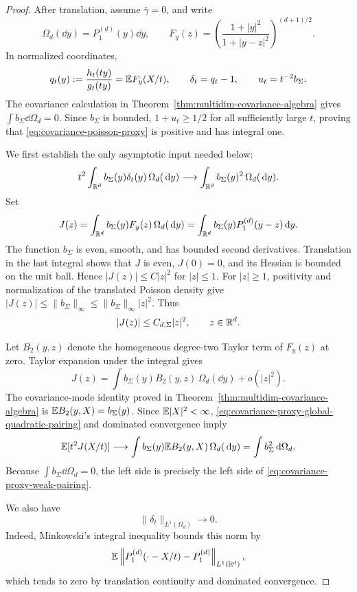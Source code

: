 \begin{proof}
After translation, assume \(\bar\gamma=0\), and write
\[
 \Omega_d(\dd y)=P_1^{(d)}(y)\dd y,
 \qquad
 F_y(z)=\left(\frac{1+|y|^2}{1+|y-z|^2}\right)^{(d+1)/2}.
\]
In normalized coordinates,
\[
 q_t(y):=\frac{h_t(ty)}{g_t(ty)}
 =\mathbb{E} F_y(X/t),
 \qquad \delta_t=q_t-1,
 \qquad u_t=t^{-2}b_\Sigma.
\]
The covariance calculation in
Theorem~\ref{thm:multidim-covariance-algebra} gives
\(\int b_\Sigma\dd\Omega_d=0\).  Since \(b_\Sigma\) is bounded,
\(1+u_t\ge1/2\) for all sufficiently large \(t\), proving that
\eqref{eq:covariance-poisson-proxy} is positive and has integral one.

We first establish the only asymptotic input needed below:
\begin{equation}\label{eq:covariance-proxy-weak-pairing}
 t^2\int_{\mathbb{R}^d}b_\Sigma(y)\delta_t(y)\,\Omega_d(\,\mathrm{d} y)
 \longrightarrow
 \int_{\mathbb{R}^d}b_\Sigma(y)^2\,\Omega_d(\,\mathrm{d} y).
\end{equation}
Set
\[
 J(z)=\int_{\mathbb{R}^d}b_\Sigma(y)F_y(z)\,\Omega_d(\,\mathrm{d} y)
 =\int_{\mathbb{R}^d}b_\Sigma(y)P_1^{(d)}(y-z)\,\mathrm{d} y.
\]
The function \(b_\Sigma\) is even, smooth, and has bounded second
derivatives.  Translation in the last integral shows that \(J\) is even,
\(J(0)=0\), and its Hessian is bounded on the unit ball.  Hence
\(|J(z)|\le C|z|^2\) for \(|z|\le1\).  For \(|z|\ge1\), positivity and
normalization of the translated Poisson density give
\(|J(z)|\le\|b_\Sigma\|_\infty\le
\|b_\Sigma\|_\infty|z|^2\).  Thus
\begin{equation}\label{eq:covariance-proxy-global-quadratic-pairing}
 |J(z)|\le C_{d,\Sigma}|z|^2,
 \qquad z\in\mathbb{R}^d.
\end{equation}

Let \(B_2(y,z)\) denote the homogeneous degree-two Taylor term of
\(F_y(z)\) at zero.  Taylor expansion under the integral gives
\[
 J(z)=\int b_\Sigma(y)B_2(y,z)\,\Omega_d(\dd y)+o(|z|^2).
\]
The covariance-mode identity proved in
Theorem~\ref{thm:multidim-covariance-algebra} is
\(\mathbb{E} B_2(y,X)=b_\Sigma(y)\).  Since \(\mathbb{E}|X|^2<\infty\),
\eqref{eq:covariance-proxy-global-quadratic-pairing} and dominated
convergence imply
\[
 \mathbb{E}[t^2J(X/t)]
 \longrightarrow
 \int b_\Sigma(y)\mathbb{E} B_2(y,X)\,\Omega_d(\,\mathrm{d} y)
 =\int b_\Sigma^2\,\mathrm{d}\Omega_d.
\]
Because \(\int b_\Sigma\dd\Omega_d=0\), the left side is precisely the
left side of \eqref{eq:covariance-proxy-weak-pairing}.

We also have
\begin{equation}\label{eq:covariance-proxy-l1-smallness}
 \|\delta_t\|_{L^1(\Omega_d)}\longrightarrow0.
\end{equation}
Indeed, Minkowski's integral inequality bounds this norm by
\[
 \mathbb{E}\left\|P_1^{(d)}(\mathord\cdot-X/t)-P_1^{(d)}
 \right\|_{L^1(\mathbb{R}^d)},
\]
which tends to zero by translation continuity and dominated convergence.


\end{proof}
